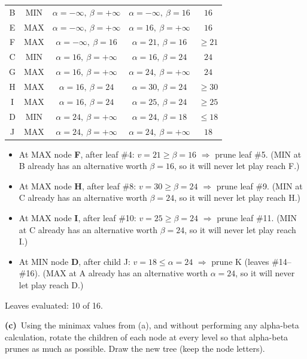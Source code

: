\documentclass[11pt,a4paper]{article}
\newcommand{\subq}[1]{\par\smallskip\noindent\textbf{#1}\ }
\begin{document}
\begin{solbox}
\begin{center}
\begin{tabular}{c c c c c}
B & MIN & $\alpha=-\infty,\ \beta=+\infty$ & $\alpha=-\infty,\ \beta=16$ & $16$ \\
E & MAX & $\alpha=-\infty,\ \beta=+\infty$ & $\alpha=16,\ \beta=+\infty$ & $16$ \\
F & MAX & $\alpha=-\infty,\ \beta=16$ & $\alpha=21,\ \beta=16$ & $\ge 21$ \\
C & MIN & $\alpha=16,\ \beta=+\infty$ & $\alpha=16,\ \beta=24$ & $24$ \\
G & MAX & $\alpha=16,\ \beta=+\infty$ & $\alpha=24,\ \beta=+\infty$ & $24$ \\
H & MAX & $\alpha=16,\ \beta=24$ & $\alpha=30,\ \beta=24$ & $\ge 30$ \\
I & MAX & $\alpha=16,\ \beta=24$ & $\alpha=25,\ \beta=24$ & $\ge 25$ \\
D & MIN & $\alpha=24,\ \beta=+\infty$ & $\alpha=24,\ \beta=18$ & $\le 18$ \\
J & MAX & $\alpha=24,\ \beta=+\infty$ & $\alpha=24,\ \beta=+\infty$ & $18$ \\\bottomrule\end{tabular}\end{center}\begin{itemize}[leftmargin=1.5em,itemsep=1pt]
\item At MAX node \textbf{F}, after leaf \#4: $v=21 \ge \beta=16$ $\Rightarrow$ prune leaf \#5. (MIN at B already has an alternative worth $\beta=16$, so it will never let play reach F.)
\item At MAX node \textbf{H}, after leaf \#8: $v=30 \ge \beta=24$ $\Rightarrow$ prune leaf \#9. (MIN at C already has an alternative worth $\beta=24$, so it will never let play reach H.)
\item At MAX node \textbf{I}, after leaf \#10: $v=25 \ge \beta=24$ $\Rightarrow$ prune leaf \#11. (MIN at C already has an alternative worth $\beta=24$, so it will never let play reach I.)
\item At MIN node \textbf{D}, after child J: $v=18 \le \alpha=24$ $\Rightarrow$ prune K (leaves \#14--\#16). (MAX at A already has an alternative worth $\alpha=24$, so it will never let play reach D.)
\end{itemize}Leaves evaluated: 10 of 16.
\end{solbox}
\subq{(c)}Using the minimax values from (a), and without performing any alpha-beta calculation, rotate the children of each node at every level so that alpha-beta prunes as much as possible. Draw the new tree (keep the node letters).
\end{document}
